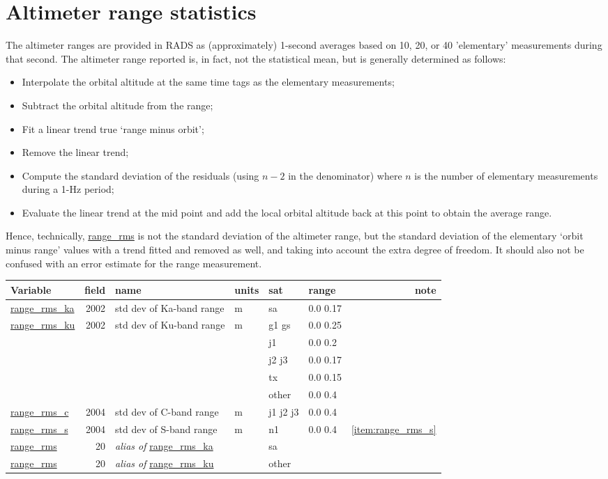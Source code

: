 \documentclass[a4paper,11pt,openany,natbib,nomargin]{thesis}
\makeatletter
\newcommand\var[1]{\url{#1}\index{variables!#1@\protect\url{#1}}}
\newcommand\alias[1]{\emph{alias of} \var{#1}}
\newenvironment{vartable}{
\begin{table}[ht]
\small
\begin{tabular}{lrllllr}
\hline
Variable & field & name & units & sat & range & note \\
\hline
}{
\hline
\end{tabular}
\end{table}
}
\makeatother
\begin{document}
\section{Altimeter range statistics}
The altimeter ranges are provided in RADS as (approximately) 1-second averages based on 10, 20, or 40 'elementary' measurements during that second. The altimeter range reported is, in fact, not the statistical mean, but is generally determined as follows:
\begin{itemize}
\item Interpolate the orbital altitude at the same time tags as the elementary measurements;
\item Subtract the orbital altitude from the range;
\item Fit a linear trend true `range minus orbit';
\item Remove the linear trend;
\item Compute the standard deviation of the residuals (using $n-2$ in the denominator) where $n$ is the number of elementary measurements during a 1-Hz period;
\item Evaluate the linear trend at the mid point and add the local orbital altitude back at this point to obtain the average range.
\end{itemize}
Hence, technically, \var{range_rms} is not the standard deviation of the altimeter range, but the standard deviation of the elementary `orbit minus range' values with a trend fitted and removed as well, and taking into account the extra degree of freedom. It should also not be confused with an error estimate for the range measurement.

\begin{vartable}
\var{range_rms_ka} & 2002 & std dev of Ka-band range & m & sa & 0.0 0.17 & \\
\var{range_rms_ku} & 2002 & std dev of Ku-band range & m & g1 gs & 0.0 0.25 & \\
                   &      &                          &   & j1 & 0.0 0.2 & \\
                   &      &                          &   & j2 j3 & 0.0 0.17 & \\
                   &      &                          &   & tx & 0.0 0.15 & \\
                   &      &                          &   & other & 0.0 0.4 & \\
\var{range_rms_c}  & 2004 & std dev of C-band range  & m & j1 j2 j3 & 0.0 0.4 & \\
\var{range_rms_s}  & 2004 & std dev of S-band range  & m & n1 & 0.0 0.4 & \ref{item:range_rms_s} \\
\hline
\var{range_rms}    &   20 & \alias{range_rms_ka} && sa && \\
\var{range_rms}    &   20 & \alias{range_rms_ku} && other && \\
\end{vartable}
\end{document}
